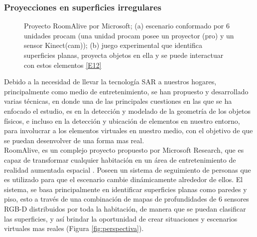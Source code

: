 \documentclass[a4paper,openright,12pt]{report}
\begin{document}
\subsubsection{Proyecciones en superficies irregulares}
\begin{figure}[th]
	\centering
	\caption[Proyecto RoomAlive por Microsoft\textregistered]{Proyecto RoomAlive por Microsoft\textregistered; (a) escenario conformado por 6 unidades procam (una unidad procam posee un proyector (pro) y un sensor Kinect\textcopyright(cam)); (b) juego experimental que identifica superficies planas, proyecta objetos en ella y se puede interactuar con estos elementos \hyperlink{e12}{[E12]}} \label{fig:roomalive}
\end{figure}
Debido a la necesidad de llevar la tecnología SAR a nuestros hogares, principalmente como medio de entretenimiento, se han propuesto y desarrollado varias técnicas, en donde una de las principales cuestiones en las que se ha enfocado el estudio, es en la detección y modelado de la geometría de los objetos físicos, e incluso en la detección y ubicación de elementos en nuestro entorno, para involucrar a los elementos virtuales en nuestro medio, con el objetivo de que se puedan desenvolver de una forma mas real.\\
RoomAlive, es un complejo proyecto propuesto por Microsoft Research\textregistered, que es capaz de transformar cualquier habitación en un área de entretenimiento de realidad aumentada espacial \citep{jones2014}. Poseen un sistema de seguimiento de personas que es utilizado para que el escenario cambie dinámicamente alrededor de ellos. El sistema, se basa principalmente en identificar superficies planas como paredes y piso, esto a través de una combinación de mapas de profundidades de 6 sensores RGB-D distribuidos por toda la habitación, de manera que se puedan clasificar las superficies, y así brindar la oportunidad de crear situaciones y escenarios virtuales mas reales (Figura \ref{fig:perspectiva}).
\end{document}
